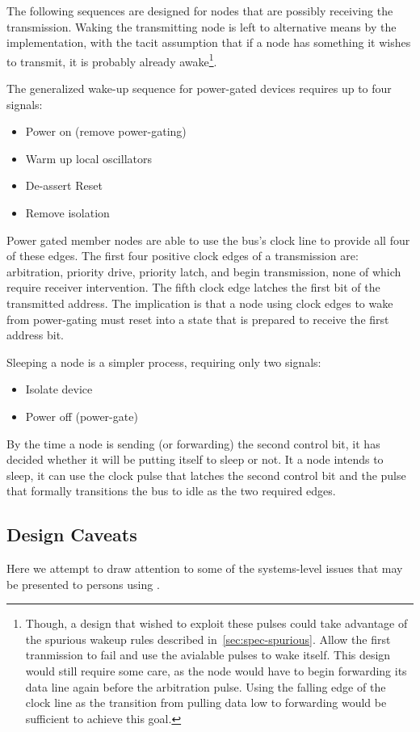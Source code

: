 The following sequences are designed for nodes that are possibly receiving the
transmission. Waking the transmitting node is left to alternative means by the
implementation, with the tacit assumption that if a node has something it
wishes to transmit, it is probably already awake\footnote{
  Though, a design that wished to exploit these pulses could take advantage of
  the spurious wakeup rules described in~\ref{sec:spec-spurious}. Allow the
  first tranmission to fail and use the avialable pulses to wake itself. This
  design would still require some care, as the node would have to begin
  forwarding its data line again before the arbitration pulse. Using the
  falling edge of the clock line as the transition from pulling data low to
  forwarding would be sufficient to achieve this goal.
}.

The generalized wake-up sequence for power-gated devices requires up to four
signals:
%
\begin{itemize}
  \item Power on (remove power-gating)
  \item Warm up local oscillators
  \item De-assert Reset
  \item Remove isolation
\end{itemize}
%
Power gated \bus member nodes are able to use the bus's clock line to provide
all four of these edges. The first four positive clock edges of a \bus
transmission are: arbitration, priority drive, priority latch, and begin
transmission, none of which require receiver intervention. The fifth clock
edge latches the first bit of the transmitted address. The implication is that
a node using \bus clock edges to wake from power-gating must reset into a
state that is prepared to receive the first address bit.

Sleeping a node is a simpler process, requiring only two signals:
%
\begin{itemize}
  \item Isolate device
  \item Power off (power-gate)
\end{itemize}
%
By the time a node is sending (or forwarding) the second control bit, it has
decided whether it will be putting itself to sleep or not. It a node intends
to sleep, it can use the clock pulse that latches the second control bit and
the pulse that formally transitions the bus to idle as the two required edges.

\subsection{Design Caveats}
Here we attempt to draw attention to some of the systems-level issues that may
be presented to persons using \bus.

